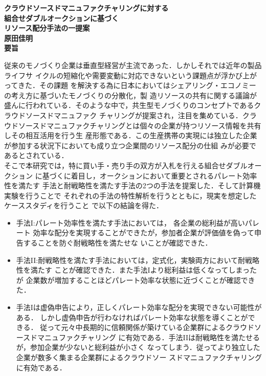 \newpage
\thispagestyle{empty}
\begin{center}
	\mbox{\LARGE{\bf{クラウドソースドマニュファクチャリングに対する}}} \\
	\mbox{\LARGE{\bf{組合せダブルオークションに基づく}}} \\
	\mbox{\LARGE{\bf{リソース配分手法の一提案}}} \\
	\vspace*{2mm}
	\mbox{\Large{\bf{原田佳明}}}\\
	\vspace*{7mm}
	{\LARGE\bf 要旨}
\end{center}\par
従来のモノづくり企業は垂直型経営が主流であった．しかしそれでは近年の製品ライフサ
イクルの短縮化や需要変動に対応できないという課題点が浮かび上がってきた．その課題
を解決する為に日本においてはシェアリング・エコノミーの考え方に基づいたモノづくりの分散化，製
造リソースの共有に関する議論が盛んに行われている．そのような中で，共生型モノづくりのコンセプトであるクラウドソースドマニュファク
チャリングが提案され，注目を集めている．クラウドソースドマニュファクチャリングとは個々の企業が持つリソース情報を共有しその相互活用を行う生
産形態である．この生産携帯の実現には独立した企業が参加する状況下においても成り立つ企業間のリソース配分の仕組
みが必要であるとされている．\\
そこで本研究では，特に買い手・売り手の双方が入札を行える組合せダブルオークション
に基づくに着目し，オークションにおいて重要とされるパレート効率性を満たす
手法と耐戦略性を満たす手法の2つの手法を提案した．そして計算機実験を行うことで
それぞれの手法の特性解析を行うとともに，現実を想定したケーススタディを行うこと
で以下の結論を得た．
\begin{itemize}
\item 手法I:パレート効率性を満たす手法においては， 各企業の総利益が高いパレート
  効率な配分を実現することができたが，参加者企業が評価値を偽って申告することを防ぐ耐戦略性を満たせな
  いことが確認できた．
\item 手法II:耐戦略性を満たす手法においては，定式化，実験両方において耐戦略性を満たす
ことが確認できた．また手法Iより総利益は低くなってしまったが
企業数が増加することほどパレート効率な状態に近づくことが確認できた．
\item 手法Iは虚偽申告により，正しくパレート効率な配分を実現できない可能性がある．
  しかし虚偽申告が行わなければパレート効率な状態を導くことができる．
  従って元々中長期的に信頼関係が築けている企業群によるクラウドソースドマニュファクチャリング
  に有効である．手法IIは耐戦略性を満たせるが，参加企業が少ないと総利益が小さく
  なってしまう．従ってより独立した企業が数多く集まる企業群によるクラウドソー
  スドマニュファクチャリングに有効である．
\end{itemize}